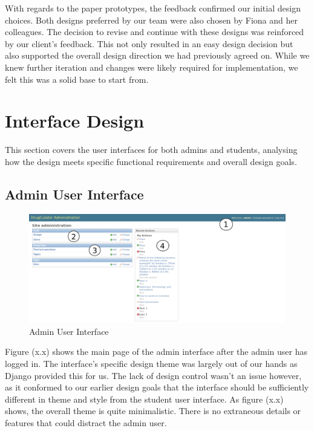 \documentclass{l3proj}
\begin{document}
With regards to the paper prototypes, the feedback confirmed our initial design choices. Both designs preferred by our team were also chosen by Fiona and her colleagues. The decision to revise and continue with these designs was reinforced by our client's feedback. This not only resulted in an easy design decision but also supported the overall design direction we had previously agreed on. While we knew further iteration and changes were likely required for implementation, we felt this was a solid base to start from.

\section{Interface Design}

This section covers the user interfaces for both admins and students, analysing how the design meets specific functional requirements and overall design goals.

\subsection{Admin User Interface}

\begin{figure}[!htb]
\caption{Admin User Interface}
\includegraphics[width=\linewidth]{images/admin_interface1.png}
\end{figure}

Figure (x.x) shows the main page of the admin interface after the admin user has logged in. The interface's specific design theme was largely out of our hands as Django provided this for us. The lack of design control wasn't an issue however, as it conformed to our earlier design goals that the interface should be sufficiently different in theme and style from the student user interface. As figure (x.x) shows, the overall theme is quite minimalistic. There is no extraneous details or features that could distract the admin user.
\end{document}
